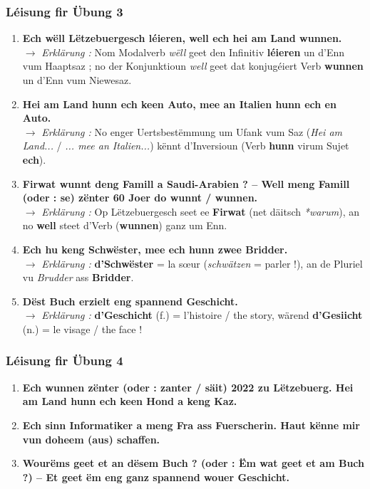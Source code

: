 \subsubsection*{Léisung fir Übung 3}
\begin{enumerate}
    \item \textbf{Ech wëll Lëtzebuergesch léieren, well ech hei am Land wunnen.} \\
    $\rightarrow$ \textit{Erklärung :} Nom Modalverb \textit{wëll} geet den Infinitiv \textbf{léieren} un d'Enn vum Haaptsaz ; no der Konjunktioun \textit{well} geet dat konjugéiert Verb \textbf{wunnen} un d'Enn vum Niewesaz.
    \item \textbf{Hei am Land hunn ech keen Auto, mee an Italien hunn ech en Auto.} \\
    $\rightarrow$ \textit{Erklärung :} No enger Uertsbestëmmung um Ufank vum Saz (\textit{Hei am Land...} / \textit{... mee an Italien...}) kënnt d'Inversioun (Verb \textbf{hunn} virum Sujet \textbf{ech}).
    \item \textbf{Firwat wunnt deng Famill a Saudi-Arabien ? -- Well meng Famill (oder : se) zënter 60 Joer do wunnt / wunnen.} \\
    $\rightarrow$ \textit{Erklärung :} Op Lëtzebuergesch seet ee \textbf{Firwat} (net däitsch \textit{*warum}), an no \textbf{well} steet d'Verb (\textbf{wunnen}) ganz um Enn.
    \item \textbf{Ech hu keng Schwëster, mee ech hunn zwee Bridder.} \\
    $\rightarrow$ \textit{Erklärung :} \textbf{d'Schwëster} = la sœur (\textit{schwätzen} = parler !), an de Pluriel vu \textit{Brudder} ass \textbf{Bridder}.
    \item \textbf{Dëst Buch erzielt eng spannend Geschicht.} \\
    $\rightarrow$ \textit{Erklärung :} \textbf{d'Geschicht} (f.) = l'histoire / the story, wärend \textbf{d'Gesiicht} (n.) = le visage / the face !
\end{enumerate}

\subsubsection*{Léisung fir Übung 4}
\begin{enumerate}
    \item \textbf{Ech wunnen zënter (oder : zanter / säit) 2022 zu Lëtzebuerg. Hei am Land hunn ech keen Hond a keng Kaz.}
    \item \textbf{Ech sinn Informatiker a meng Fra ass Fuerscherin. Haut kënne mir vun doheem (aus) schaffen.}
    \item \textbf{Wourëms geet et an dësem Buch ? (oder : Ëm wat geet et am Buch ?) -- Et geet ëm eng ganz spannend wouer Geschicht.}
\end{enumerate}

